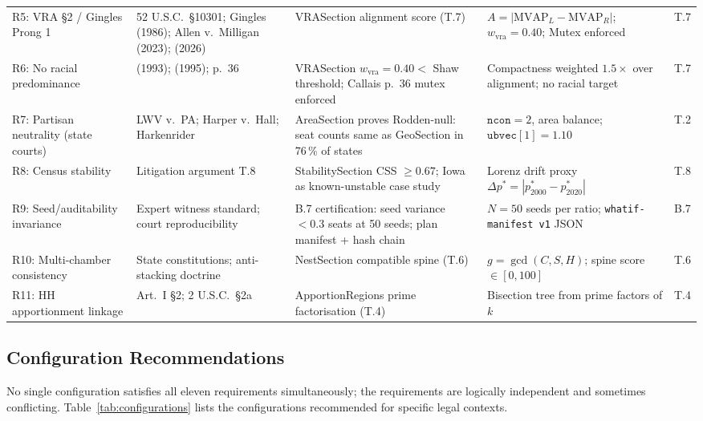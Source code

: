 \begin{landscape}
\begin{table}[p]
\begin{tabular}{p{3.5cm}p{2.5cm}p{3.5cm}p{2.0cm}p{1.5cm}}
R5: VRA \S2 / Gingles Prong 1 & 52 U.S.C.\ \S10301; Gingles (1986); Allen v.\ Milligan (2023); \callais{} (2026) & VRASection alignment score (T.7) & $A=|\mathrm{MVAP}_L - \mathrm{MVAP}_R|$; $w_\text{vra}=0.40$; Mutex enforced & T.7 \\[0.5em]

R6: No racial predominance & \shaw{} (1993); \miller{} (1995); \callais{} p.~36 & VRASection $w_\text{vra}=0.40 < $ Shaw threshold; Callais p.~36 mutex enforced & Compactness weighted $1.5\times$ over alignment; no racial target & T.7 \\[0.5em]

R7: Partisan neutrality (state courts) & LWV v.\ PA; Harper v.\ Hall; Harkenrider & AreaSection proves Rodden-null: seat counts same as GeoSection in 76\,\% of states & $\mathtt{ncon}=2$, area balance; $\mathtt{ubvec}[1]=1.10$ & T.2 \\[0.5em]

R8: Census stability & Litigation argument T.8 & StabilitySection CSS $\geq 0.67$; Iowa as known-unstable case study & Lorenz drift proxy $\Delta p^* = |p^*_{2000} - p^*_{2020}|$ & T.8 \\[0.5em]

R9: Seed/auditability invariance & Expert witness standard; court reproducibility & B.7 certification: seed variance $<0.3$ seats at 50 seeds; plan manifest + hash chain & $N=50$ seeds per ratio; \texttt{whatif-manifest v1} JSON & B.7 \\[0.5em]

R10: Multi-chamber consistency & State constitutions; anti-stacking doctrine & NestSection compatible spine (T.6) & $g=\gcd(C,S,H)$; spine score $\in [0, 100]$ & T.6 \\[0.5em]

R11: HH apportionment linkage & Art.~I \S2; 2 U.S.C.\ \S2a & ApportionRegions prime factorisation (T.4) & Bisection tree from prime factors of $k$ & T.4 \\
\bottomrule
\end{tabular}
\end{table}
\end{landscape}

\subsection{Configuration Recommendations}

No single configuration satisfies all eleven requirements simultaneously;
the requirements are logically independent and sometimes conflicting.
Table~\ref{tab:configurations} lists the configurations recommended for specific
legal contexts.


